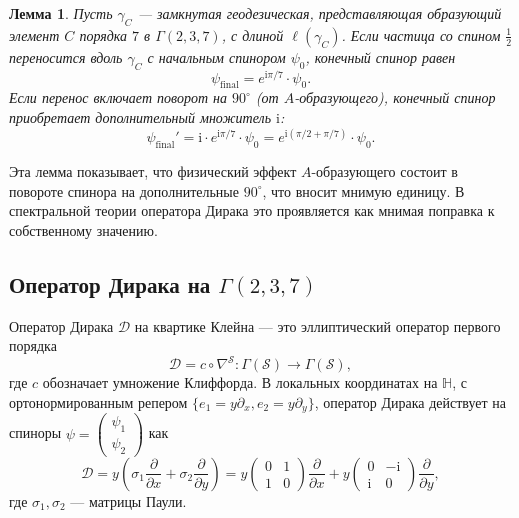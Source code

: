 \documentclass[12pt,a4paper]{article}
\newtheorem{lemma}[theorem]{Лемма}
\theoremstyle{definition}
\theoremstyle{remark}
\newcommand{\HH}{\mathbb{H}}
\newcommand{\cD}{\mathcal{D}}
\newcommand{\cS}{\mathcal{S}}
\newcommand{\ii}{\mathrm{i}}
\begin{document}
\begin{lemma}
\label{lem:transport}
Пусть $\gamma_C$ --- замкнутая геодезическая, представляющая образующий элемент $C$ порядка $7$ в $\Gamma(2,3,7)$, с длиной $\ell(\gamma_C)$. Если частица со спином $\frac{1}{2}$ переносится вдоль $\gamma_C$ с начальным спинором $\psi_0$, конечный спинор равен
\begin{equation}
\psi_{\mathrm{final}} = e^{\ii\pi/7} \cdot \psi_0.
\end{equation}
Если перенос включает поворот на $90^\circ$ (от $A$-образующего), конечный спинор приобретает дополнительный множитель $\ii$:
\begin{equation}
\psi_{\mathrm{final}}' = \ii \cdot e^{\ii\pi/7} \cdot \psi_0 = e^{\ii(\pi/2 + \pi/7)} \cdot \psi_0.
\end{equation}
\end{lemma}

Эта лемма показывает, что физический эффект $A$-образующего состоит в повороте спинора на дополнительные $90^\circ$, что вносит мнимую единицу. В спектральной теории оператора Дирака это проявляется как мнимая поправка к собственному значению.

\subsection{Оператор Дирака на $\Gamma(2,3,7)$}

Оператор Дирака $\cD$ на квартике Клейна --- это эллиптический оператор первого порядка
\begin{equation}
\cD = c \circ \nabla^{\cS} \colon \Gamma(\cS) \to \Gamma(\cS),
\end{equation}
где $c$ обозначает умножение Клиффорда. В локальных координатах на $\HH$, с ортонормированным репером $\{e_1 = y \partial_x, e_2 = y \partial_y\}$, оператор Дирака действует на спиноры $\psi = \begin{pmatrix} \psi_1 \\ \psi_2 \end{pmatrix}$ как
\begin{equation}
\cD = y \left( \sigma_1 \frac{\partial}{\partial x} + \sigma_2 \frac{\partial}{\partial y} \right) = y \begin{pmatrix} 0 & 1 \\ 1 & 0 \end{pmatrix} \frac{\partial}{\partial x} + y \begin{pmatrix} 0 & -\ii \\ \ii & 0 \end{pmatrix} \frac{\partial}{\partial y},
\end{equation}
где $\sigma_1, \sigma_2$ --- матрицы Паули.
\end{document}
